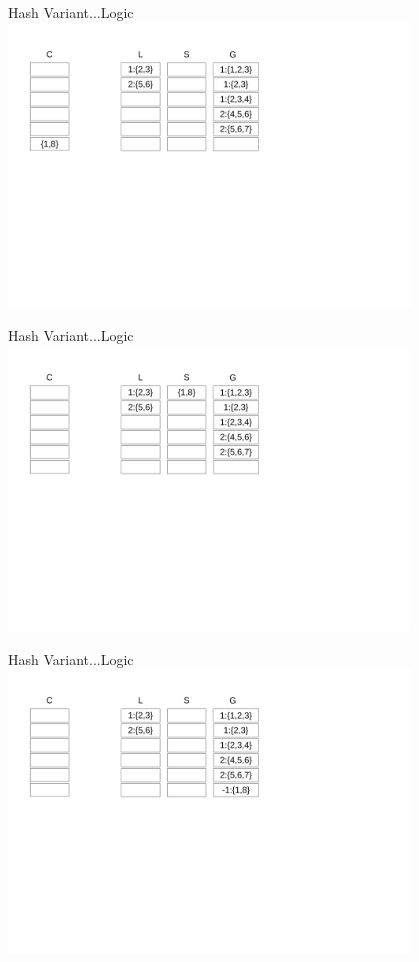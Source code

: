 \documentclass{beamer}
\begin{document}
\begin{frame}{Hash Variant...}{Logic}
    \centering
    \includegraphics[trim={1cm 10cm 11cm 1cm}, clip,width=0.8\textwidth]{figures/L6} 
\end{frame}
\begin{frame}{Hash Variant...}{Logic}
    \centering
    \includegraphics[trim={1cm 10cm 11cm 1cm}, clip,width=0.8\textwidth]{figures/L7} 
\end{frame}
\begin{frame}{Hash Variant...}{Logic}
    \centering
    \includegraphics[trim={1cm 10cm 11cm 1cm}, clip,width=0.8\textwidth]{figures/L8} 
\end{frame}
\end{document}
